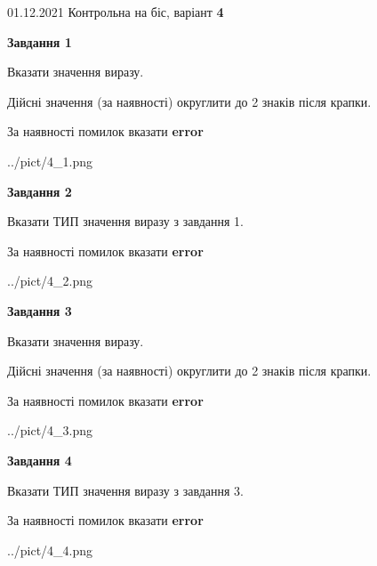 \documentclass[11pt, ukrainian]{article}
\begin{document}
{01.12.2021 Контрольна на біс, варіант  \No \textbf { 4 }\par}
{
\begin {large}
{\begin {center}\textbf{Завдання 1}\end {center}}\par
Вказати значення виразу. \par
Дійсні значення (за наявності) округлити до 2 знаків після крапки. \par
За наявності помилок вказати \textbf{error}

\begin{center}
	{../pict/4_1.png}
\end{center}
\newpage

{\begin {center}\textbf{Завдання 2}\end {center}}\par
Вказати ТИП значення виразу з завдання 1. \par
За наявності помилок вказати \textbf{error}

\begin{center}
	{../pict/4_2.png}
\end{center}
\newpage

{\begin {center}\textbf{Завдання 3}\end {center}}\par
Вказати значення виразу. \par
Дійсні значення (за наявності) округлити до 2 знаків після крапки. \par
За наявності помилок вказати \textbf{error}

\begin{center}
	{../pict/4_3.png}
\end{center}
\newpage

{\begin {center}\textbf{Завдання 4}\end {center}}\par
Вказати ТИП значення виразу з завдання 3. \par
За наявності помилок вказати \textbf{error}

\begin{center}
	{../pict/4_4.png}
\end{center}
\newpage


\end{large}}
\end{document}
